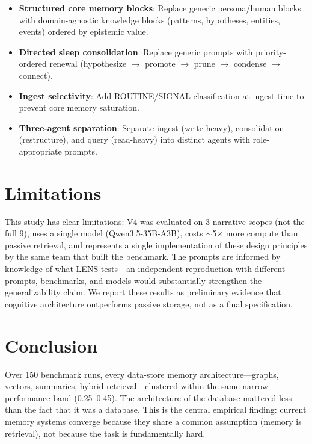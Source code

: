 \documentclass[11pt,letterpaper]{article}
\begin{document}
\begin{itemize}[nosep]
  \item \textbf{Structured core memory blocks}: Replace generic persona/human blocks with domain-agnostic knowledge blocks (patterns, hypotheses, entities, events) ordered by epistemic value.
  \item \textbf{Directed sleep consolidation}: Replace generic prompts with priority-ordered renewal (hypothesize $\to$ promote $\to$ prune $\to$ condense $\to$ connect).
  \item \textbf{Ingest selectivity}: Add ROUTINE/SIGNAL classification at ingest time to prevent core memory saturation.
  \item \textbf{Three-agent separation}: Separate ingest (write-heavy), consolidation (restructure), and query (read-heavy) into distinct agents with role-appropriate prompts.
\end{itemize}

\section{Limitations}
\label{sec:limitations}

This study has clear limitations: V4 was evaluated on 3 narrative scopes (not the full 9), uses a single model (Qwen3.5-35B-A3B), costs $\sim$5$\times$ more compute than passive retrieval, and represents a single implementation of these design principles by the same team that built the benchmark. The prompts are informed by knowledge of what LENS tests---an independent reproduction with different prompts, benchmarks, and models would substantially strengthen the generalizability claim. We report these results as preliminary evidence that cognitive architecture outperforms passive storage, not as a final specification.

\section{Conclusion}
\label{sec:conclusion}

Over 150 benchmark runs, every data-store memory architecture---graphs, vectors, summaries, hybrid retrieval---clustered within the same narrow performance band (0.25--0.45). The architecture of the database mattered less than the fact that it was a database. This is the central empirical finding: current memory systems converge because they share a common assumption (memory is retrieval), not because the task is fundamentally hard.
\end{document}

